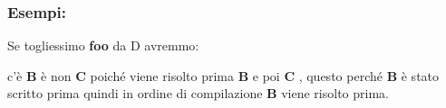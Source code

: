 \subsubsection{Esempi:}

\newpage

Se togliessimo \textbf{foo} da D avremmo:

c'è \textbf{B} è non \textbf{C} poiché viene risolto prima \textbf{B} e poi \textbf{C} , questo perché \textbf{B} è stato scritto prima quindi in ordine di compilazione \textbf{B} viene risolto prima.
\newpage

